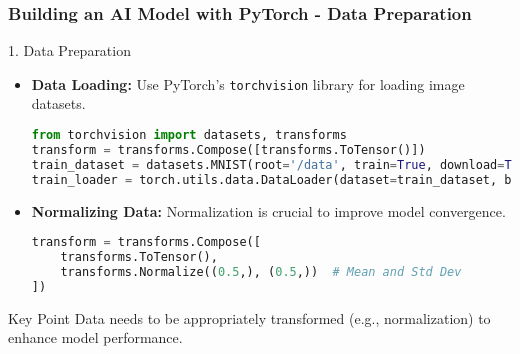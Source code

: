 \documentclass[aspectratio=169]{beamer}
\begin{document}
\begin{frame}[fragile]
    \frametitle{Building an AI Model with PyTorch - Data Preparation}
    \begin{block}{1. Data Preparation}
        \begin{itemize}
            \item \textbf{Data Loading:}
            Use PyTorch's \texttt{torchvision} library for loading image datasets.
            \begin{lstlisting}[language=Python]
from torchvision import datasets, transforms
transform = transforms.Compose([transforms.ToTensor()])
train_dataset = datasets.MNIST(root='/data', train=True, download=True, transform=transform)
train_loader = torch.utils.data.DataLoader(dataset=train_dataset, batch_size=64, shuffle=True)
            \end{lstlisting}

            \item \textbf{Normalizing Data:}
            Normalization is crucial to improve model convergence.
            \begin{lstlisting}[language=Python]
transform = transforms.Compose([
    transforms.ToTensor(),
    transforms.Normalize((0.5,), (0.5,))  # Mean and Std Dev
])
            \end{lstlisting}
        \end{itemize}
    \end{block}

    \begin{block}{Key Point}
        Data needs to be appropriately transformed (e.g., normalization) to enhance model performance.
    \end{block}
\end{frame}
\end{document}
